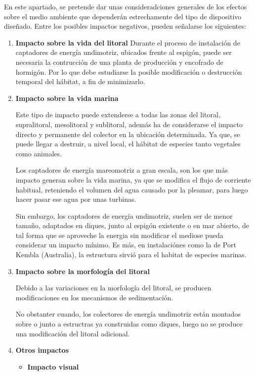 En este apartado, se pretende dar unas consideradciones generales de los
efectos sobre el medio ambiente que dependerán estrechamente del tipo de
dispositivo diseñado. Entre los posibles impactos negativos, pueden
señalarse los siguientes:

\begin{enumerate}
\def\labelenumi{\arabic{enumi}.}
\item
  \textbf{Impacto sobre la vida del litoral} Durante el proceso de
  instalación de captadores de energía undimotriz, ubicados frente al
  espigón, puede ser necesaria la contrucción de una planta de
  producción y encofrado de hormigón. Por lo que debe estudiarse la
  posible modificación o destrucción temporal del hábitat, a fin de
  minimizarlo.
\item
  \textbf{Impacto sobre la vida marina}

  Este tipo de impacto puede extenderse a todas las zonas del litoral,
  supralitoral, mesolitoral y sublitoral, además ha de considerarse el
  impacto directo y permanente del colector en la ubicación determinada.
  Ya que, se puede llegar a destruir, a nivel local, el hábitat de
  especies tanto vegetales como animales.

  Los captadores de energía mareomotriz a gran escala, son los que más
  impacto generan sobre la vida marina, ya que se modifica el flujo de
  corriente habitual, reteniendo el volumen del agua causado por la
  pleamar, para luego hacer pasar ese agua por unas turbinas.

  Sin embargo, los captadores de energía undimotriz, suelen ser de menor
  tamaño, adaptados en diques, junto al espigón existente o en mar
  abierto, de tal forma que se aproveche la energia sin modificar el
  mediose pueda considerar un impacto mínimo. Es más, en instalaciónes
  como la de Port Kembla (Australia), la estructura sirvió para el
  habitat de especies marinas. 
\item
  \textbf{Impacto sobre la morfología del litoral}

  Debido a las variaciones en la morfología del litoral, se producen
  modificaciones en los mecanismos de sedimentación.

  No obstanter cuando, los colectores de energía undimotriz están
  montados sobre o junto a estructras ya construidas como diques, luego
  no se produce una modificación del litoral adicional.
\item
  \textbf{Otros impactos}

  \begin{itemize}
  \item
    \textbf{Impacto visual}


\end{itemize}
\end{enumerate}

